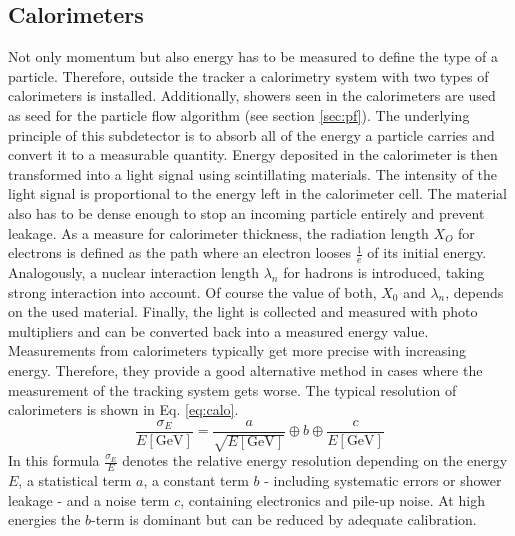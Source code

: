 \subsection{Calorimeters}
	Not only momentum but also energy has to be measured to define the type of a particle. Therefore, outside the tracker a calorimetry system with two types of calorimeters is installed. Additionally, showers seen in the calorimeters are used as seed for the particle flow algorithm (see section \ref{sec:pf}). The underlying principle of this subdetector is to absorb all of the energy a particle carries and convert it to a measurable quantity. Energy deposited in the calorimeter is then transformed into a light signal using scintillating materials. The intensity of the light signal is proportional to the energy left in the calorimeter cell. The material also has to be dense enough to stop an incoming particle entirely and prevent leakage. As a measure for calorimeter thickness, the radiation length $X_O$ for electrons is defined as the path where an electron looses $\frac{1}{e}$ of its initial energy. Analogously, a nuclear interaction length $\lambda_n$ for hadrons is introduced, taking strong interaction into account. Of course the value of both, $X_0$ and $\lambda_n$, depends on the used material. Finally, the light is collected and measured with photo multipliers and can be converted back into a measured energy value. Measurements from calorimeters typically get more precise with increasing energy. Therefore, they provide a good alternative method in cases where the measurement of the tracking system gets worse. The typical resolution of calorimeters is shown in Eq. \ref{eq:calo}.
	\begin{equation}
	\frac{\sigma_E}{E\left[\text{GeV}\right]} = \frac{a}{\sqrt{E\left[\text{GeV}\right]}} \oplus b \oplus \frac{c}{E\left[\text{GeV}\right]}
	\label{eq:calo}
	\end{equation}
	In this formula $\frac{\sigma_E}{E}$ denotes the relative energy resolution depending on the energy $E$, a statistical term $a$, a constant term $b$ - including systematic errors or shower leakage - and a noise term $c$, containing electronics and pile-up noise. At high energies the $b$-term is dominant but can be reduced by adequate calibration. 
